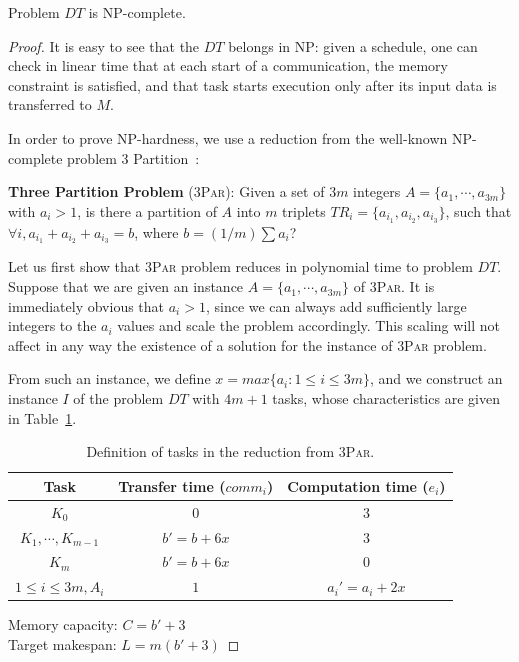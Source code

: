 \documentclass[sigconf]{acmart}
\newcommand{\threepart}{\textsc{3Par}\xspace}
\begin{document}
	\begin{theorem}\label{th:npComplete}
		Problem $DT$ is NP-complete.
	\end{theorem}
	\begin{proof}
		
		It is easy to see that the $DT$ belongs in NP: given a schedule, one
		can check in linear time that at each start of a communication, the
		memory constraint is satisfied, and that task starts execution only
		after its input data is transferred to $M$.
		
		In order to prove NP-hardness, we use a reduction from the
		well-known NP-complete problem 3 Partition~\cite{GareyJohnson}: 
		
		\noindent \textbf{Three Partition Problem} (\threepart): Given a set of
		$3m$ integers $A = \{ a_1, \cdots, a_{3m }\}$ with $a_i > 1$, is there a partition
		of $A$ into $m$ triplets $TR_i = \{a_{i_1}, a_{i_2}, a_{i_3}\}$,
		such that $\forall i, a_{i_1} + a_{i_2} + a_{i_3} = b$, where
		$b=(1/m) \sum a_i $?
		
		Let us first show that \threepart problem reduces in polynomial time to
		problem $DT$. Suppose that we are given an instance $A = \{ a_1,
		\cdots, a_{3m }\}$ of \threepart. It is immediately obvious that
		$a_i>1$, since we can always add sufficiently large integers to
		the $a_i$ values and scale the problem accordingly. This scaling will not
		affect in any way the existence of a solution for the instance of
		\threepart problem.
		
		From such an instance, we define $x = max\{a_i:1\le i\le 3m\}$,
		and we construct an instance $I$ of the problem $DT$ with $4m+1$
		tasks, whose characteristics are given in
		Table~\ref{table:np.completeness.tasks}.
		
		\begin{table}[htb]
			\begin{tabular}{ |c|c|c| }
				\hline
				Task & Transfer time ($comm_i$)& Computation time ($e_i$)\\ \hline
				$K_0$ & $0$ & $3$ \\ \hline
				$K_1, \cdots, K_{m-1}$ & $b'=b+6x$ & $3$\\ \hline
				$K_m$ & $b'=b+6x$ & $0$ \\ \hline
				$1\le i \le 3m, A_i$ & $1$ & $a_i' = a_i + 2x$\\ \hline
			\end{tabular}
			\noindent Memory capacity: $C=b'+3$\\
			\noindent Target makespan: $L=m(b'+3)$
			\caption{Definition of tasks in the reduction from \threepart.}
			\label{table:np.completeness.tasks}
		\end{table}
		

\end{proof}
\end{document}
